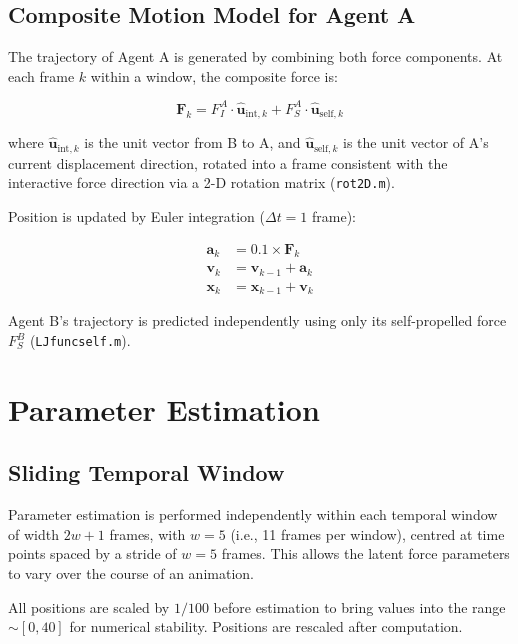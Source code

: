 \documentclass[11pt,a4paper]{article}
\begin{document}
\subsection{Composite Motion Model for Agent A}

The trajectory of Agent A is generated by combining both force components. At each frame $k$ within a window, the composite force is:

\begin{equation}
    \mathbf{F}_k = F_I^A \cdot \hat{\mathbf{u}}_{\text{int},k} + F_S^A \cdot \hat{\mathbf{u}}_{\text{self},k}
\end{equation}

\noindent where $\hat{\mathbf{u}}_{\text{int},k}$ is the unit vector from B to A, and $\hat{\mathbf{u}}_{\text{self},k}$ is the unit vector of A's current displacement direction, rotated into a frame consistent with the interactive force direction via a 2-D rotation matrix (\texttt{rot2D.m}).

Position is updated by Euler integration ($\Delta t = 1$ frame):

\begin{align}
    \mathbf{a}_k &= 0.1 \times \mathbf{F}_k \\
    \mathbf{v}_k &= \mathbf{v}_{k-1} + \mathbf{a}_k \\
    \mathbf{x}_k &= \mathbf{x}_{k-1} + \mathbf{v}_k
\end{align}

\noindent Agent B's trajectory is predicted independently using only its self-propelled force $F_S^B$ (\texttt{LJfuncself.m}).

\section{Parameter Estimation}

\subsection{Sliding Temporal Window}

Parameter estimation is performed independently within each temporal window of width $2w + 1$ frames, with $w = 5$ (i.e., 11 frames per window), centred at time points spaced by a stride of $w = 5$ frames. This allows the latent force parameters to vary over the course of an animation.

\noindent All positions are scaled by $1/100$ before estimation to bring values into the range $\sim[0, 40]$ for numerical stability. Positions are rescaled after computation.
\end{document}
